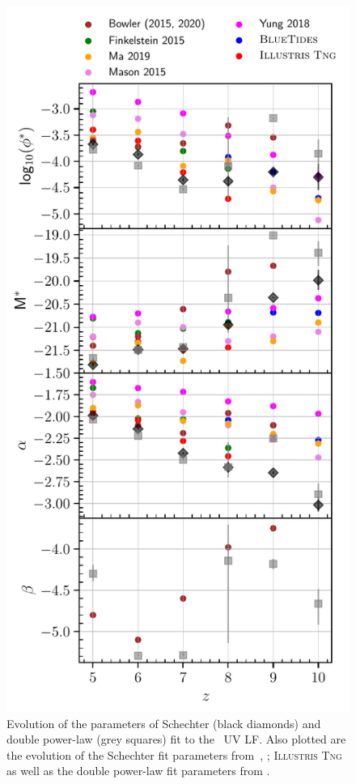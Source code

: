 \begin{figure}
	\centering
	\includegraphics[width=\columnwidth]{./figures/fit_params_evo}
	\caption{Evolution of the parameters of Schechter (black diamonds) and double power-law (grey squares) fit to the \flares\, UV LF. Also plotted are the evolution of the Schechter fit parameters from \bluetides\,\protect\citep{Wilkins2017}, \protect\cite{Mason2015,Finkelstein2015,yung_semi-analytic_2019}; \textsc{Illustris Tng} \protect\citep[Model-C from][]{Vogelsberger2020} as well as the double power-law fit parameters from \protect\cite{Bowler2015,Bowler2020}. \label{fig: fit param evo}} 
\end{figure}

